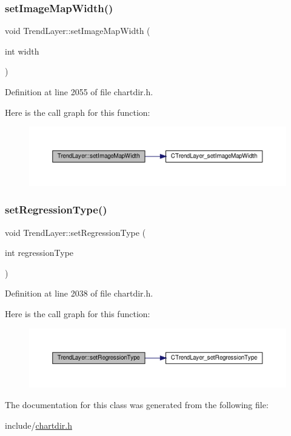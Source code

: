 \subsubsection{\texorpdfstring{set\+Image\+Map\+Width()}{setImageMapWidth()}}
{\footnotesize\ttfamily void Trend\+Layer\+::set\+Image\+Map\+Width (\begin{DoxyParamCaption}\item[{int}]{width }\end{DoxyParamCaption})\hspace{0.3cm}{\ttfamily [inline]}}



Definition at line 2055 of file chartdir.\+h.

Here is the call graph for this function\+:
\nopagebreak
\begin{figure}[H]
\begin{center}
\leavevmode
\includegraphics[width=350pt]{class_trend_layer_af0bec09b9dd8ed3fea44cd133addd76a_cgraph}
\end{center}
\end{figure}
\mbox{\label{class_trend_layer_aa32739ea081068795e269705701ce944}} 
\subsubsection{\texorpdfstring{set\+Regression\+Type()}{setRegressionType()}}
{\footnotesize\ttfamily void Trend\+Layer\+::set\+Regression\+Type (\begin{DoxyParamCaption}\item[{int}]{regression\+Type }\end{DoxyParamCaption})\hspace{0.3cm}{\ttfamily [inline]}}



Definition at line 2038 of file chartdir.\+h.

Here is the call graph for this function\+:
\nopagebreak
\begin{figure}[H]
\begin{center}
\leavevmode
\includegraphics[width=350pt]{class_trend_layer_aa32739ea081068795e269705701ce944_cgraph}
\end{center}
\end{figure}


The documentation for this class was generated from the following file\+:\begin{DoxyCompactItemize}
\item 
include/\hyperlink{chartdir_8h}{chartdir.\+h}\end{DoxyCompactItemize}
